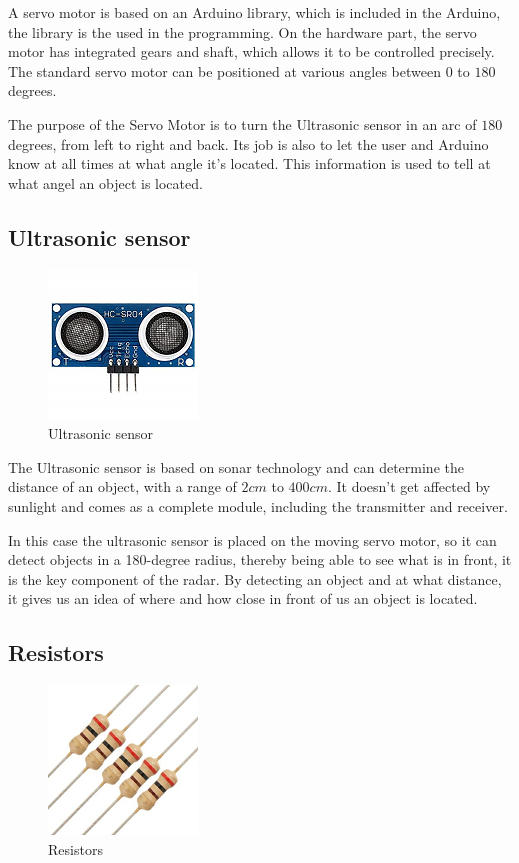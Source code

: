 A servo motor is based on an Arduino library, which is included in the Arduino, the library is the used in the programming. On the hardware part, the servo motor has integrated gears and shaft, which allows it to be controlled precisely. The standard servo motor can be positioned at various angles between $0$ to $180$ degrees. 

The purpose of the Servo Motor is to turn the Ultrasonic sensor in an arc of $180$ degrees, from left to right and back. Its job is also to let the user and Arduino know at all times at what angle it's located. This information is used to tell at what angel an object is located. 


\subsection{Ultrasonic sensor}

\begin{figure} [h!]
\centering
  \includegraphics{fig/Ultrasonicsensor}
  \caption{Ultrasonic sensor}
  \label{fig:ultrasonic}
\end{figure}

The Ultrasonic sensor is based on sonar technology and can determine the distance of an object, with a range of $2 cm$ to $400 cm$. It doesn't get affected by sunlight and comes as a complete module, including the transmitter and receiver.  

In this case the ultrasonic sensor is placed on the moving servo motor, so it can detect objects in a 180-degree radius, thereby being able to see what is in front, it is the key component of the radar. By detecting an object and at what distance, it gives us an idea of where and how close in front of us an object is located.   

\subsection{Resistors}

\begin{figure} [h!]
\centering
  \includegraphics{fig/Resistor}
  \caption{Resistors}
  \label{fig:Resistors}
\end{figure}

